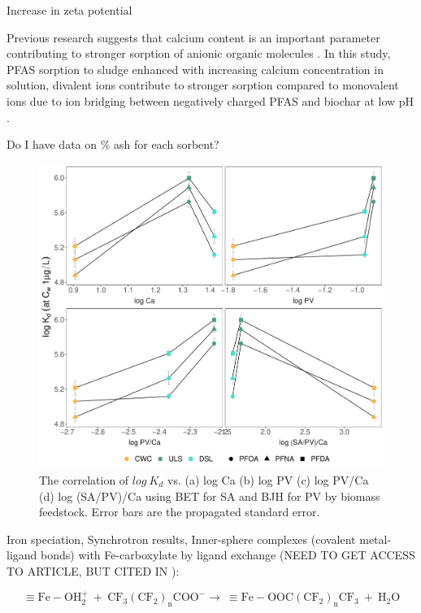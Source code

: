 Increase in zeta potential 

Previous research suggests that calcium content is an important parameter contributing to stronger sorption of anionic organic molecules \citep{higgins2006sorption,sigmund2022sorption}. In this study, PFAS sorption to sludge enhanced with increasing calcium concentration in solution, divalent ions contribute to stronger sorption compared to monovalent ions due to ion bridging between negatively charged PFAS and biochar at low pH \citep{zhang2013sorption,arvaniti2014sorption,arvaniti2015review}. 

Do I have data on \% ash for each sorbent?
\begin{figure}[htb]
    \centering
    \includegraphics[width=\textwidth]{R/figs/Correlation_SAPV_Ca_plot.pdf}
    \caption{The correlation of $log~K_d$ vs. (a) log Ca (b) log PV (c) log PV/Ca (d) log (SA/PV)/Ca using BET for SA and BJH for PV by biomass feedstock. Error bars are the propagated standard error.}
    \label{fig:Kd_SAPV_Ca}
\end{figure}


Iron speciation, Synchrotron results, Inner-sphere complexes (covalent metal-ligand bonds) with Fe-carboxylate by ligand exchange \citep{gao2012adsorption}(NEED TO GET ACCESS TO ARTICLE, BUT CITED IN \citep{du2014adsorption}):

\begin{equation}
    \mathrm{\equiv Fe-OH_2^+~ + ~ CF_3(CF_2)_nCOO^- \rightarrow   ~ \equiv Fe-OOC(CF_2)_nCF_3 ~+~ H_2O}
\end{equation}

